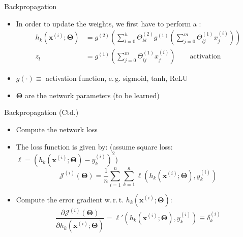 \begin{frame}{Backpropagation}{}\important
	\begin{itemize}
		\item In order to update the weights, we first have to perform a :
		\begin{align*}
			h_k(\bm{x}^{(i)}; \bm{\Theta})
				&= g^{(2)}\left( \sum_{l=0}^h \Theta_{kl}^{(2)} g^{(1)}\left( \sum_{j=0}^m \Theta_{lj}^{(1)} x_{j}^{(i)} \right) \right) \\
			z_l
				&=  g^{(1)}\left( \sum_{j=0}^m \Theta_{lj}^{(1)} x_{j}^{(i)} \right) \qquad\text{activation}
		\end{align*}
		\item $g(\cdot) \equiv$ activation function, e.\,g. sigmoid, tanh, ReLU
		\item $\bm{\Theta}$ are the network parameters (to be learned)
	\end{itemize}
\end{frame}


\begin{frame}[plain]{}{}
	
\end{frame}


\begin{frame}{Backpropagation (Ctd.)}{}\important
	\begin{itemize}
		\item Compute the network loss
		\item The loss function is given by: {\footnotesize(assume square loss: $\ell = (h_k(\bm{x}^{(i)}; \bm{\Theta}) - y_k^{(i)})^2$)}
		\begin{equation*}
			\mathcal{J}^{(i)}(\bm{\Theta}) = \frac{1}{n} \sum_{i=1}^n \sum_{k=1}^\kappa
				\ell(h_k(\bm{x}^{(i)}; \bm{\Theta}), y_k^{(i)})
		\end{equation*}
		\item Compute the error gradient w.\,r.\,t. $h_k(\bm{x}^{(i)}; \bm{\Theta})$:
		\begin{equation*}
			 \frac{\partial \mathcal{J}^{(i)}(\bm{\Theta})}{\partial h_k(\bm{x}^{(i)}; \bm{\Theta})}
			 	= \ell'(h_k(\bm{x}^{(i)}; \bm{\Theta}), y_k^{(i)}) \equiv \delta_k^{(i)}
		\end{equation*}
	\end{itemize}
\end{frame}


